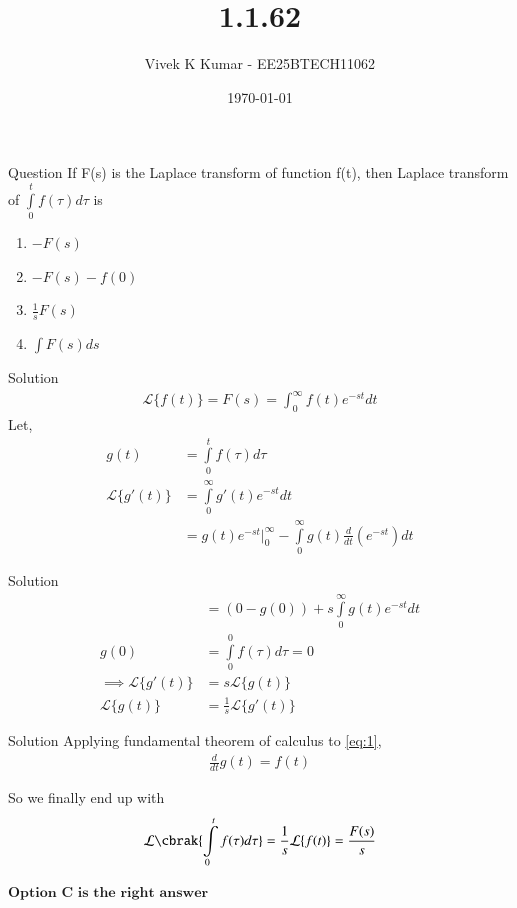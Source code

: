 \documentclass{beamer}
\title 
{1.1.62}
\date{\today}
\author 
{Vivek K Kumar - EE25BTECH11062}
\begin{document}
\frame{\titlepage}

\begin{frame}{Question}
If F(s) is the Laplace transform of function f(t), then Laplace transform of $\int\limits_0^t f(\tau) d\tau$ is
\begin{enumerate}
    \item $-F(s)$
    \item $-F(s) - f(0)$
    \item $\frac{1}{s}F(s)$
    \item $\int F(s)ds$
\end{enumerate}
\end{frame}

\begin{frame}{Solution}
\begin{align}
\mathcal{L}\{f(t)\} = F(s) = \int_0^{\infty}f(t)e^{-st}dt
\end{align}
Let, 
\begin{align}
    g(t) &= \int\limits_0^tf(\tau)d\tau \label{eq:1} \\
    \mathcal{L}\{g'(t)\} &= \int\limits_0^\infty g'(t)e^{-st}dt \\
    &= g(t)e^{-st} \bigg|_{0}^{\infty} - \int\limits_0^\infty g(t)\frac{d}{dt}(e^{-st})dt 
\end{align}
\end{frame}

\begin{frame}{Solution}
\begin{align}
    &= (0 - g(0)) + s\int\limits_0^\infty g(t)e^{-st}dt \\
    g(0) &= \int\limits_0^0f(\tau)d\tau
         = 0\\
    \implies \mathcal{L}\{g'(t)\} &= s \mathcal{L}\{g(t)\} \\
    \mathcal{L}\{g(t)\} &= \frac{1}{s}\mathcal{L}\{g'(t)\}
\end{align}
\end{frame}

\begin{frame}{Solution}
Applying fundamental theorem of calculus to \eqref{eq:1},
\begin{align}
    \frac{d}{dt}g(t) = f(t)
\end{align}

So we finally end up with
\begin{align}
    \mathcal{L}\cbrak{\int\limits_0^tf(\tau)d\tau} = \frac{1}{s}\mathcal{L}\{f(t)\} = \frac{F(s)}{s}
\end{align}
\begin{center}
$\boxed{\textbf{Option C is the right answer}}$
\end{center}
\end{frame}
\end{document}
